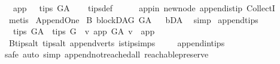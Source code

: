 \begin{isabellebody}
\ \ {\isachardoublequoteopen}app\ \ {\isasymin}\ tips\ G{\isacharunderscore}{\kern0pt}A{\isachardoublequoteclose}\isanewline
%
\isadelimproof
\ \ %
\endisadelimproof
%
\isatagproof
{}\isamarkupfalse%
\ tips{\isacharunderscore}{\kern0pt}def\ \ \isanewline
\ \ \isamarkupfalse%
\ app{\isacharunderscore}{\kern0pt}in\ new{\isacharunderscore}{\kern0pt}node\ append{\isacharunderscore}{\kern0pt}is{\isacharunderscore}{\kern0pt}tip\ CollectI\isanewline
\ \ \isamarkupfalse%
\ metis%
\endisatagproof
{\isafoldproof}%
%
\isadelimproof
\isanewline
%
\endisadelimproof
\isanewline
\isanewline
{}\isamarkupfalse%
\ Append{\isacharunderscore}{\kern0pt}One\isanewline
{}\isanewline
{}\isamarkupfalse%
\ B{}{\isacharcolon}{\kern0pt}\ blockDAG\ G{\isacharunderscore}{\kern0pt}A%
\isadelimproof
\ %
\endisadelimproof
%
\isatagproof
{}\isamarkupfalse%
\ bD{\isacharunderscore}{\kern0pt}A\ \isamarkupfalse%
\ simp%
\endisatagproof
{\isafoldproof}%
%
\isadelimproof
%
\endisadelimproof
\isanewline
{}\isamarkupfalse%
\ append{\isacharunderscore}{\kern0pt}tips{\isacharcolon}{\kern0pt}\isanewline
\ \ {\isachardoublequoteopen}tips\ G{\isacharunderscore}{\kern0pt}A\ {\isacharequal}{\kern0pt}\ tips\ G\ {\isacharminus}{\kern0pt}\ {\isacharbraceleft}{\kern0pt}v{\isachardot}{\kern0pt}\ {\isacharparenleft}{\kern0pt}app\ {\isasymrightarrow}\isactrlsup {\isacharplus}{\kern0pt}\isactrlbsub G{\isacharunderscore}{\kern0pt}A\isactrlesub \ v{\isacharparenright}{\kern0pt}{\isacharbraceright}{\kern0pt}\ {\isasymunion}\ {\isacharbraceleft}{\kern0pt}app{\isacharbraceright}{\kern0pt}{\isachardoublequoteclose}\isanewline
%
\isadelimproof
\ \ %
\endisadelimproof
%
\isatagproof
{}\isamarkupfalse%
\ B{}{\isachardot}{\kern0pt}tips{\isacharunderscore}{\kern0pt}alt\ tips{\isacharunderscore}{\kern0pt}alt\ append{\isacharunderscore}{\kern0pt}verts\ is{\isacharunderscore}{\kern0pt}tip{\isachardot}{\kern0pt}simps\ \isanewline
\ \ \isamarkupfalse%
\ append{\isacharunderscore}{\kern0pt}in{\isacharunderscore}{\kern0pt}tips\ \isanewline
{}\isamarkupfalse%
{\isacharparenleft}{\kern0pt}safe{\isacharcomma}{\kern0pt}\ auto\ simp{\isacharcolon}{\kern0pt}\ append{\isacharunderscore}{\kern0pt}not{\isacharunderscore}{\kern0pt}reached{\isacharunderscore}{\kern0pt}all\ reachable{}{\isacharunderscore}{\kern0pt}preserve{\isacharparenright}{\kern0pt}\ \isamarkupfalse%
%
\endisatagproof

\end{isabellebody}
